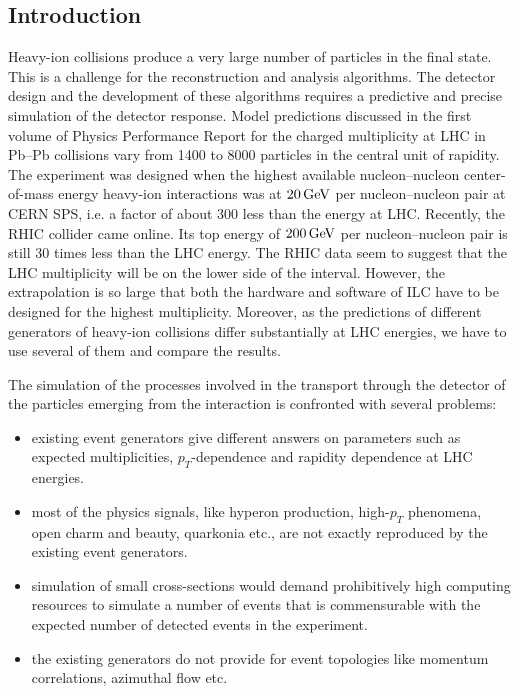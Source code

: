 \documentclass[12pt,a4paper,twoside]{article}
\begin{document}
\subsection{Introduction}
Heavy-ion collisions produce a very large number of particles in the
final state. This is a challenge for the reconstruction and analysis
algorithms. The detector design and the development of these algorithms requires a predictive
and precise simulation of the detector response.  Model predictions
discussed in the first volume of Physics Performance Report for the
charged multiplicity at LHC in \mbox{Pb--Pb} collisions vary from 1400
to 8000 particles in the central unit of rapidity.  The experiment was
designed when the highest available nucleon--nucleon center-of-mass energy
heavy-ion interactions was at $20 \, {\rm GeV}$ per nucleon--nucleon
pair at CERN SPS, i.e. a factor of about 300 less than the energy at
LHC.  Recently, the RHIC collider came online.  Its top energy of
$200\, {\rm GeV}$ per nucleon--nucleon pair is still 30 times less
than the LHC energy.  The RHIC data seem to suggest that the LHC
multiplicity will be on the lower side of the interval. However, the
extrapolation is so large that both the hardware and software of ILC
have to be designed for the highest multiplicity.  Moreover, as the
predictions of different generators of heavy-ion collisions differ
substantially at LHC energies, we have to use several of them and
compare the results.

The simulation of the processes involved in the transport through the
detector of the particles emerging from the interaction is confronted
with several problems:

\begin {itemize}
\item existing event generators give different answers on parameters
  such as expected multiplicities, $p_T$-dependence and rapidity
  dependence at LHC energies.

\item most of the physics signals, like hyperon production, high-$p_T$
  phenomena, open charm and beauty, quarkonia etc., are not exactly
  reproduced by the existing event generators.

\item simulation of small cross-sections would demand prohibitively
  high computing resources to simulate a number of events that is commensurable with
  the expected number of detected events in the experiment.

\item the existing generators do not provide for event topologies like
  momentum correlations, azimuthal flow etc.
\end {itemize}
\end{document}
